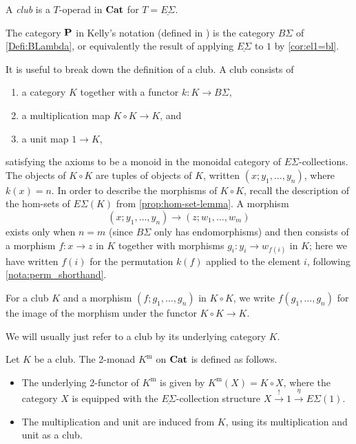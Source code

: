 \begin{Defi}[(Club)]\label{Defi:club}
A \textit{club} is a $T$-operad in $\mathbf{Cat}$ for $T = \underline{E\Sigma}$.
\end{Defi}

\begin{rem}[($\mb{P} = B\Sigma = \underline{E\Sigma}(1)$)]
The category $\mathbf{P}$ in Kelly's notation (defined in \cite[Section 2]{kelly_club0}) is the category $B\Sigma$ of \cref{Defi:BLambda}, or equivalently
 the result of applying $\underline{E\Sigma}$ to $1$ by \cref{cor:el1=bl}.
\end{rem}

\begin{rem}\label{rem:exp-club}
It is useful to break down the definition of a club. A club consists of
\begin{enumerate}
\item a category $K$ together with a functor $k \colon K \rightarrow B \Sigma$,
\item a multiplication map $K \circ K \rightarrow K$, and
\item a unit map $1 \rightarrow K$,
\end{enumerate}
satisfying the axioms to be a monoid in the monoidal category of $E\Sigma$-collections. The objects of $K \circ K$  are tuples of objects of $K$, written $(x; y_{1}, \ldots, y_{n})$, where $k(x) = n$. In order to describe the morphisms of $K \circ K$, recall the description of the hom-sets of $E\Sigma(K)$ from \cref{prop:hom-set-lemma}.
A morphism
  \[
    (x; y_{1}, \ldots, y_{n}) \rightarrow (z; w_{1}, \ldots, w_{m})
  \]
exists only when $n=m$ (since $B\Sigma$ only has endomorphisms) and then consists of a morphism $f \colon x \rightarrow z$ in $K$ together with morphisms $g_{i} \colon y_{i} \rightarrow w_{f(i)}$ in $K$; here we have written $f(i)$ for the permutation $k(f)$ applied to the element $i$, following \cref{nota:perm_shorthand}.
\end{rem}

\begin{nota}\label{nota:clubmult}
For a club $K$ and a morphism $(f; g_{1}, \ldots, g_{n})$ in $K \circ K$, we write $f(g_{1}, \ldots, g_{n})$ for the image of the morphism under the functor $K \circ K \rightarrow K$.
\end{nota}

We will usually just refer to a club by its underlying category $K$.

\begin{Defi}\label{Defi:2monad-from-club}
Let $K$ be a club. The 2-monad $K^{\textrm{m}}$ on $\mathbf{Cat}$ is defined as follows.
\begin{itemize}
\item The underlying 2-functor of $K^{\textrm{m}}$ is given by $K^{\textrm{m}}(X) = K \circ X$, where the category $X$ is equipped with the $\underline{E\Sigma}$-collection structure $X \stackrel{!}{\to} 1 \stackrel{\eta}{\to} E\Sigma(1)$.
\item The multiplication and unit are induced from $K$, using its multiplication and unit as a club.
\end{itemize}
\end{Defi}

